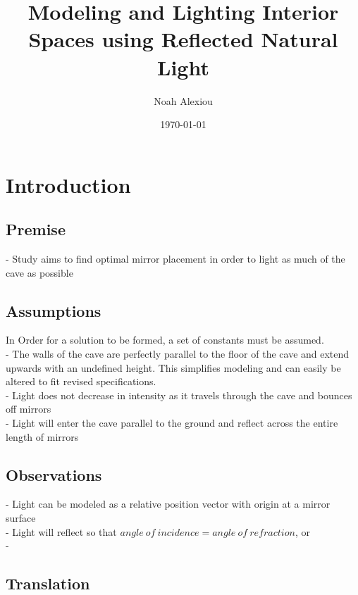 \documentclass[11pt, letterpaper]{article}
\begin{document}
\title{Modeling and Lighting Interior Spaces using Reflected Natural Light}
\author{Noah Alexiou}
\date{\today}
\maketitle
\newpage
\tableofcontents
\newpage


\section{Introduction}


\subsection{Premise}
- Study aims to find optimal mirror placement in order to light as much of the cave as possible




\subsection{Assumptions}
\par
In Order for a solution to be formed, a set of constants must be assumed.
\\
- The walls of the cave are perfectly parallel to the floor of the cave and extend upwards with an undefined height. This simplifies modeling and can easily be altered to fit revised specifications.
\\
- Light does not decrease in intensity as it travels through the cave and bounces off mirrors
\\
- Light will enter the cave parallel to the ground and reflect across the entire length of mirrors


\subsection{Observations}
\par

- Light can be modeled as a relative position vector with origin at a mirror surface
\\
- Light will reflect so that $angle \: of \:incidence = angle \: of \: refraction$, or 
\\
- 




\subsection{Translation}
\end{document}
